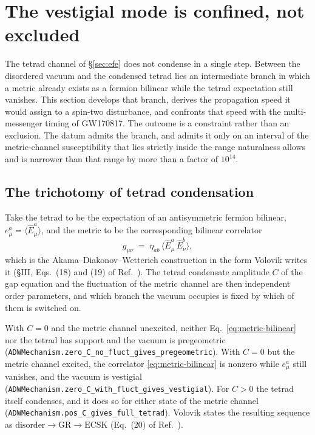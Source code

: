 \documentclass[aps,prd,nofootinbib,superscriptaddress,12pt]{revtex4-2}
\DeclareRobustCommand{\lb}{\discretionary{}{}{}}
\begin{document}
\section{The vestigial mode is confined, not excluded}
\label{sec:vestigial}

The tetrad channel of \S\ref{sec:efe} does not condense in a single step.
Between the disordered vacuum and the condensed tetrad lies an
intermediate branch in which a metric already exists as a fermion
bilinear while the tetrad expectation still vanishes. This section
develops that branch, derives the propagation speed it would assign to a
spin-two disturbance, and confronts that speed with the multi-messenger
timing of GW170817. The outcome is a constraint rather than an exclusion.
The datum admits the branch, and admits it only on an interval of the
metric-channel susceptibility that lies strictly inside the range
naturalness allows and is narrower than that range by more than a factor
of $10^{14}$.

\subsection{The trichotomy of tetrad condensation}
\label{sec:vestigial-trichotomy}

Take the tetrad to be the expectation of an antisymmetric fermion
bilinear, $e^a_\mu = \langle \hat E^a_\mu \rangle$, and the metric to be
the corresponding bilinear correlator
\begin{equation}
\label{eq:metric-bilinear}
g_{\mu\nu} \;=\; \eta_{ab}\,\bigl\langle \hat E^a_\mu\, \hat E^b_\nu
\bigr\rangle ,
\end{equation}
\noindent
which is the Akama--Diakonov--Wetterich construction in the form Volovik
writes it (\S III, Eqs.~(18) and (19) of
Ref.~\cite{Volovik2024Vestigial}). The tetrad condensate amplitude $C$ of
the gap equation and the fluctuation of the metric channel are then
independent order parameters, and which branch the vacuum occupies is
fixed by which of them is switched on.

With $C = 0$ and the metric channel unexcited, neither
Eq.~\eqref{eq:metric-bilinear} nor the tetrad has support and the vacuum
is pregeometric
(\texttt{ADWMechanism.\lb{}zero\_\lb{}C\_\lb{}no\_\lb{}fluct\_\lb{}gives\_\lb{}pregeometric}). With
$C = 0$ but the metric channel excited, the correlator
\eqref{eq:metric-bilinear} is nonzero while $e^a_\mu$ still vanishes, and
the vacuum is vestigial
(\texttt{ADWMechanism.\lb{}zero\_\lb{}C\_\lb{}with\_\lb{}fluct\_\lb{}gives\_\lb{}vestigial}). For
$C > 0$ the tetrad itself condenses, and it does so for either state of
the metric channel (\texttt{ADWMechanism.\lb{}pos\_\lb{}C\_\lb{}gives\_\lb{}full\_\lb{}tetrad}).
Volovik states the resulting sequence as
$\text{disorder} \to \text{GR} \to \text{ECSK}$ (Eq.~(20) of
Ref.~\cite{Volovik2024Vestigial}).
\end{document}
